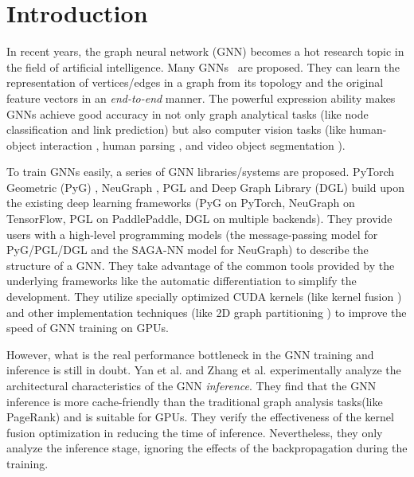\section{Introduction}

In recent years, the graph neural network (GNN) becomes a hot research topic in the field of artificial intelligence.
Many GNNs~\cite{kipf2017_gcn, defferrad2016_chebnet, li2018_agcn,li2015_ggnn, hamilton2017_graphsage, huang2018_gat, zhang2018_gaan} are proposed.
They can learn the representation of vertices/edges in a graph from its topology and the original feature vectors in an \emph{end-to-end} manner.
The powerful expression ability makes GNNs achieve good accuracy in not only graph analytical tasks \cite{zhou2018_gnn_review, zhang2018_gnn_survey, comprehensive-survey-wu-2020} (like node classification and link prediction) but also computer vision tasks (like human-object interaction \cite{qi2018_learning_humanobject}, human parsing \cite{wang2020_hierarchical_human_parsing}, and video object segmentation \cite{wang2019_zeroshot_video}).

To train GNNs easily, a series of GNN libraries/systems \cite{PyG, DGL, ma2019_neugraph, zhu2019_aligraph, PGL} are proposed.
PyTorch Geometric (PyG) \cite{PyG}, NeuGraph \cite{ma2019_neugraph}, PGL \cite{PGL} and Deep Graph Library (DGL) \cite{DGL} build upon the existing deep learning frameworks (PyG on PyTorch, NeuGraph on TensorFlow, PGL on PaddlePaddle, DGL on multiple backends).
They provide users with a high-level programming models (the message-passing model for PyG/PGL/DGL and the SAGA-NN model for NeuGraph) to describe the structure of a GNN.
They take advantage of the common tools provided by the underlying frameworks like the automatic differentiation to simplify the development.
They utilize specially optimized CUDA kernels (like kernel fusion \cite{DGL} \cite{ma2019_neugraph}) and other implementation techniques (like 2D graph partitioning \cite{ma2019_neugraph}) to improve the speed of GNN training on GPUs.

However, what is the real performance bottleneck in the GNN training and inference is still in doubt.
Yan et al. \cite{yan2020_characterizing_gcn} and Zhang et al. \cite{zhang2020_analysis_neugraph} experimentally analyze the architectural characteristics of the GNN \emph{inference}.
They find that the GNN inference is more cache-friendly than the traditional graph analysis tasks(like PageRank) and is suitable for GPUs.
They verify the effectiveness of the kernel fusion optimization in reducing the time of inference.
Nevertheless, they only analyze the inference stage, ignoring the effects of the backpropagation during the training.

